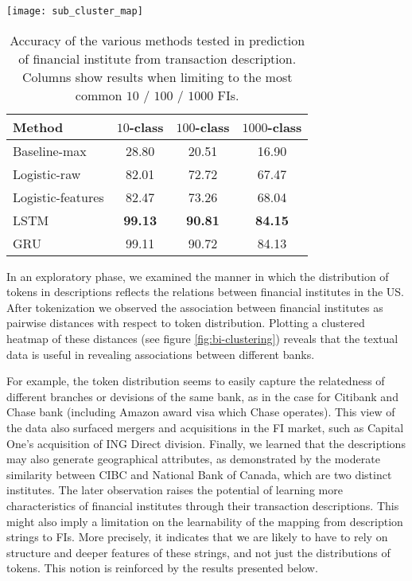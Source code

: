 \documentclass[sigconf]{acmart}
\begin{document}
\begin{figure*}
\centering{}
\texttt{[image: sub\_cluster\_map]}
\caption{A clustering of FIs based on distance between token distribution in description strings.}
\label{fig:bi-clustering}
\end{figure*}


\begin{table}
  \caption{Accuracy of the various methods tested in prediction of financial institute from transaction description. Columns show results when limiting to the most common $10$ / $100$ / $1000$ FIs.}
  \label{tab:results-moethods}
  \begin{tabular}{lccc}
    \toprule
    Method            & $10$-class & $100$-class & $1000$-class   \\
    \midrule
    Baseline-max      & 28.80 & 20.51 & 16.90 \\
    Logistic-raw      & 82.01 & 72.72 & 67.47 \\
    Logistic-features & 82.47 & 73.26 & 68.04 \\
    LSTM              & \textbf{99.13} & \textbf{90.81} & \textbf{84.15} \\
    GRU               & 99.11 & 90.72 & 84.13 \\
    \bottomrule
\end{tabular}
\end{table}

In an exploratory phase, we examined the manner in which the distribution of tokens in descriptions reflects the relations between financial institutes in the US. After tokenization we observed the association between financial institutes as pairwise distances with respect to token distribution. Plotting a clustered heatmap of these distances (see figure \ref{fig:bi-clustering}) reveals that the textual data is useful in revealing associations between different banks. 

For example, the token distribution seems to easily capture the relatedness of different branches or devisions of the same bank, as in the case for Citibank and Chase bank (including Amazon award visa which Chase operates). This view of the data also surfaced mergers and acquisitions in the FI market, such as Capital One's acquisition of ING Direct division. Finally, we learned that the descriptions may also generate geographical attributes, as demonstrated by the moderate similarity between CIBC and National Bank of Canada, which are two distinct institutes. The later observation raises the potential of learning more characteristics of financial institutes through their transaction descriptions. This might also imply a limitation on the learnability of the mapping from description strings to FIs. More precisely, it indicates that we are likely to have to rely on structure and deeper features of these strings, and not just the distributions of tokens. This notion is reinforced by the results presented below. 
\end{document}
